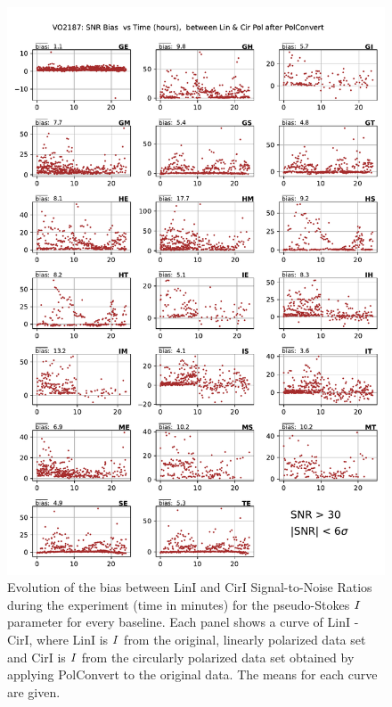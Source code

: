 \documentclass[letterpaper,twoside,12pt]{article}
\begin{document}
\begin{figure}[ht!]
  \begin{center}
  \includegraphics[width=33pc]{VO2187_SNR_bias_between_Lin_I_and_Cir_I_SNR_floor_30.pdf}
  \caption{\small Evolution of the bias between LinI and CirI Signal-to-Noise Ratios during the experiment (time in minutes) for the pseudo-Stokes $\protect I$ parameter for every baseline. Each panel shows a curve of LinI - CirI, where LinI is $\protect I$ from the original, linearly polarized data set and CirI is $\protect I$ from the circularly polarized data set obtained by applying PolConvert to the original data. The means for each curve are given.}
  \label{snr_lin_cir_bias}
  \end{center}
\end{figure}
\end{document}

